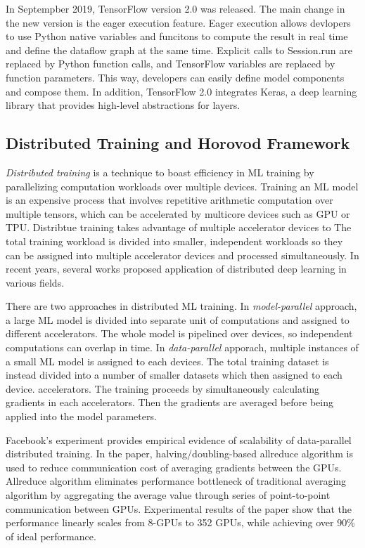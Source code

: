 In Septempber 2019, TensorFlow version 2.0 was released\cite{tf2announce}.
The main change in the new version is the eager execution feature.
Eager execution allows devlopers to use Python native variables
and funcitons to compute the result in real time and define the
dataflow graph at the same time.
Explicit calls to Session.run are replaced by Python function calls,
and TensorFlow variables are replaced by function parameters.
This way, developers can easily define model components and compose them. 
In addition, TensorFlow 2.0 integrates Keras\cite{keras},
a deep learning library that provides high-level abstractions for layers.


\subsection{Distributed Training and Horovod Framework}

\textit{Distributed training} is a technique to boast efficiency in ML training
by parallelizing computation workloads over multiple devices.
Training an ML model is an expensive process that involves repetitive
arithmetic computation over multiple tensors,
which can be accelerated by multicore devices such as GPU or TPU. 
Distribtue training takes advantage of multiple accelerator devices to
The total training workload is divided into smaller, independent workloads
so they can be assigned into multiple accelerator devices and
processed simultaneously. 
In recent years, several works proposed application of distributed
deep learning in various fields.

There are two approaches in distributed ML training.
In \textit{model-parallel} approach, a large ML model is divided into 
separate unit of computations and assigned to different accelerators. 
The whole model is pipelined over devices, so independent computations
can overlap in time.
In \textit{data-parallel} apporach, multiple instances of a small ML model
is assigned to each devices. The total training dataset is instead
divided into a number of smaller datasets which then assigned to each device.
accelerators. The training proceeds by simultaneously calculating gradients
in each accelerators. Then the gradients are averaged before being 
applied into the model parameters.

Facebook's experiment \cite{facebook2018} provides empirical evidence of
scalability of data-parallel distributed training. In the paper, 
halving/doubling-based allreduce algorithm is used to reduce communication cost 
of averaging gradients between the GPUs. 
Allreduce algorithm eliminates performance bottleneck of traditional
averaging algorithm by aggregating the average value through series of
point-to-point communication between GPUs. 
Experimental results of the paper show that the performance linearly
scales from 8-GPUs to 352 GPUs, while achieving over 90\% of ideal performance.

